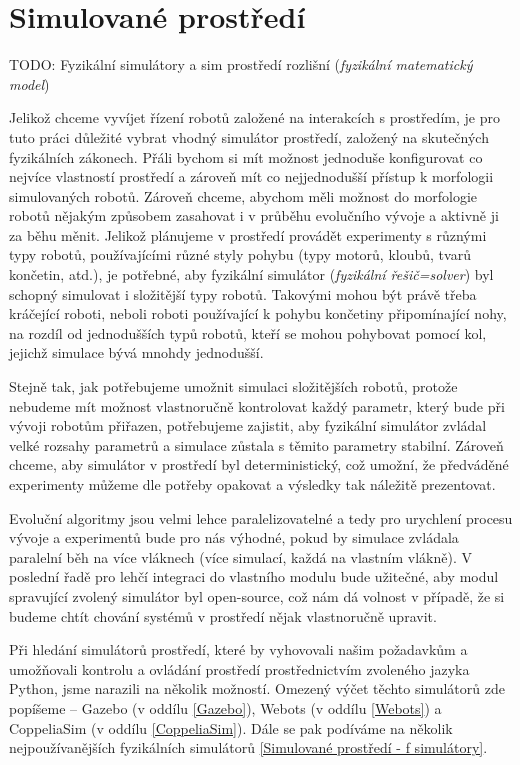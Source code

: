 \section{Simulované prostředí} \label{Simulované prostředí}

TODO: Fyzikální simulátory a sim prostředí rozlišní (\emph{fyzikální
matematický model})

Jelikož chceme vyvíjet řízení robotů založené na interakcích s prostředím, je
pro tuto práci důležité vybrat vhodný simulátor prostředí, založený na
skutečných fyzikálních zákonech. Přáli bychom si mít možnost jednoduše
konfigurovat co nejvíce vlastností prostředí a zároveň mít co nejjednodušší
přístup k morfologii simulovaných robotů. Zároveň chceme, abychom měli možnost
do morfologie robotů nějakým způsobem zasahovat i v průběhu evolučního vývoje a
aktivně ji za běhu měnit. Jelikož plánujeme v prostředí provádět experimenty s
různými typy robotů, používajícími různé styly pohybu (typy motorů, kloubů,
tvarů končetin, atd.), je potřebné, aby fyzikální simulátor (\emph{fyzikální
řešič=solver}) byl schopný simulovat i složitější typy robotů. Takovými mohou
být právě třeba kráčející roboti, neboli roboti používající k pohybu končetiny
připomínající nohy, na rozdíl od jednodušších typů robotů, kteří se mohou
pohybovat pomocí kol, jejichž simulace bývá mnohdy jednodušší. 

Stejně tak, jak potřebujeme umožnit simulaci složitějších robotů, protože
nebudeme mít možnost vlastnoručně kontrolovat každý parametr, který bude při
vývoji robotům přiřazen, potřebujeme zajistit, aby fyzikální simulátor zvládal
velké rozsahy parametrů a simulace zůstala s těmito parametry stabilní. Zároveň
chceme, aby simulátor v prostředí byl deterministický, což umožní, že
předváděné experimenty můžeme dle potřeby opakovat a výsledky tak náležitě
prezentovat. 

Evoluční algoritmy jsou velmi lehce paralelizovatelné a tedy pro
urychlení procesu vývoje a experimentů bude pro nás výhodné, pokud by simulace
zvládala paralelní běh na více vláknech (více simulací, každá na vlastním
vlákně). V poslední řadě pro lehčí integraci do vlastního modulu bude užitečné,
aby modul spravující zvolený simulátor byl open-source, což nám dá volnost v
případě, že si budeme chtít chování systémů v prostředí nějak vlastnoručně
upravit.

Při hledání simulátorů prostředí, které by vyhovovali našim požadavkům a
umožňovali kontrolu a ovládání prostředí prostřednictvím zvoleného jazyka
Python, jsme narazili na několik možností. Omezený výčet těchto simulátorů zde
popíšeme -- Gazebo (v oddílu \ref{Gazebo}), Webots (v oddílu \ref{Webots}) a
CoppeliaSim (v oddílu \ref{CoppeliaSim}). Dále se pak podíváme na několik
nejpoužívanějších fyzikálních simulátorů \ref{Simulované prostředí - f
simulátory}.

